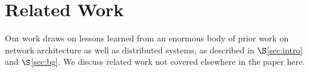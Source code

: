 %





\vspace{-0.1in}
\section{Related Work}
\label{sec:related}


Our work draws on lessons learned from an enormous body of prior work on network architecture as well as distributed systems, as described in $\S$\ref{sec:intro} and $\S$\ref{sec:bg}. We discuss related work not covered elsewhere in the paper here.


